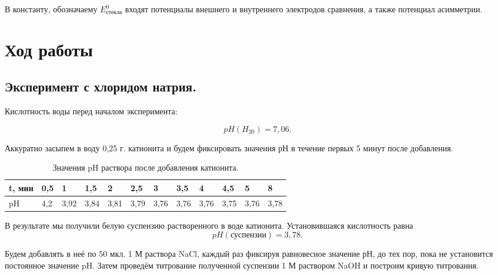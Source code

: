 \documentclass[a4paper,12pt]{article} %
\begin{document}
В константу, обозначаему $E^0_{\textrm{стекла}}$ входят потенциалы внешнего и
внутреннего электродов сравнения, а также потенциал асимметрии.

\section{Ход работы}

\subsection{Эксперимент с хлоридом натрия.}

Кислотность воды перед началом эксперимента:

\begin{equation*}
    pH (H_20)= 7,06.
\end{equation*}

Аккуратно засыпем в воду 0,25 г. катионита и будем фиксировать значения рН в течение первых 5 минут после добавления.

\begin{table}[H]
    \centering
    \begin{tabular}{|l|l|l|l|l|l|l|l|l|l|l|l|}
    \hline
        t, мин & 0,5 & 1 & 1,5 & 2 & 2,5 & 3 & 3,5 & 4 & 4,5 & 5 & 8 \\ \hline
        pH & 4,2 & 3,92 & 3,84 & 3,81 & 3,79 & 3,76 & 3,76 & 3,76 &  3,75 & 3,76 & 3,78 \\ \hline
    \end{tabular}
    \caption{Значения pH раствора после добавления катионита.}
\end{table}

В результате мы получили белую суспензию растворенного в воде катионита. Установившаяся кислотность равна 
 \begin{equation*}
     pH(\textit{суспензии}) = 3,78.
 \end{equation*}



Будем добавлять в неё по 50 мкл. 1 М раствора NaCl,
каждый раз фиксируя равновесное значение рН, до тех пор, пока не установится постоянное значение pH. Затем проведём титрование полученной суспензии 1 М раствором NaOH и построим кривую титрования.
\end{document}
